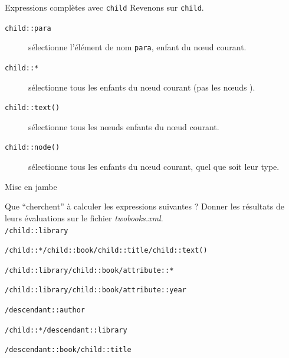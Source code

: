 \begin{frame}{Expressions complètes avec \texttt{child}}
Revenons sur \texttt{child}.

\begin{description}
\item[\verb?child::para?] sélectionne l'élément de nom \texttt{para}, enfant du n{\oe}ud courant. 

\item[\verb?child::*?] sélectionne tous les  enfants du n{\oe}ud courant (pas les n{\oe}uds ). 

\item[\verb?child::text()?] sélectionne tous les n{\oe}uds  enfants du n{\oe}ud courant.

\item[\verb?child::node()?] sélectionne tous les  enfants du n{\oe}ud courant, quel que soit leur type.
\end{description}


\end{frame}



\begin{frame}{Mise en jambe}

\begin{small}

\begin{exoblock}
Que ``cherchent'' à calculer les expressions suivantes ? Donner les résultats de leurs évaluations sur le fichier \textit{twobooks.xml}.\\

\verb?/child::library?

\verb?/child::*/child::book/child::title/child::text()? 

\verb?/child::library/child::book/attribute::*?	

\verb?/child::library/child::book/attribute::year?	

\verb?/descendant::author? 


\verb?/child::*/descendant::library? 

\verb?/descendant::book/child::title? 

\end{exoblock}

\end{small}


\end{frame}


